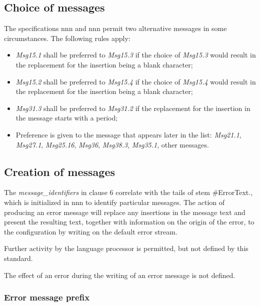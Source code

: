 \subsection{Choice of messages}\label{choice-of-messages}

The specifications nnn and nnn permit two alternative messages in some
circumstances. The following rules apply:

\begin{itemize}
\item
  \emph{Msg15.1} shall be preferred to \emph{Msg15.3} if the choice of
  \emph{Msg15.3} would result in the replacement for the insertion being
  a blank character;
\item
  \emph{Msg15.2} shall be preferred to \emph{Msg15.4} if the choice of
  \emph{Msg15.4} would result in the replacement for the insertion being
  a blank character;
\item
  \emph{Msg31.3} shall be preferred to \emph{Msg31.2} if the replacement
  for the insertion in the message starts with a period;
\item
  Preference is given to the message that appears later in the list:
  \emph{Msg21.1}, \emph{Msg27.1}, \emph{Msg25.16}, \emph{Msg36},
  \emph{Msg38.3}, \emph{Msg35.1}, other messages.
\end{itemize}

\subsection{Creation of messages}\label{creation-of-messages}

The \emph{message\_identifiers} in clause 6 correlate with the tails of
stem \#ErrorText., which is initialized in nnn to identify particular
messages. The action of producing an error message will replace any
insertions in the message text and present the resulting text, together
with information on the origin of the error, to the configuration by
writing on the default error stream.

Further activity by the language processor is permitted, but not defined
by this standard.

The effect of an error during the writing of an error message is not
defined.

\subsubsection{Error message prefix}\label{error-message-prefix}

